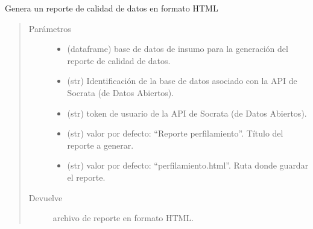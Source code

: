\documentclass[letterpaper,10pt,openany,spanish]{sphinxmanual}
\begin{document}
\label{\detokenize{reporte:module-reporte}}

\begin{fulllineitems}
\label{\detokenize{reporte:reporte.generar_reporte}}
Genera un reporte de calidad de datos en formato HTML
\begin{quote}\begin{description}
\item[{Parámetros}] \leavevmode\begin{itemize}
\item {} 
 \textendash{} (dataframe) base de datos de insumo para la generación del reporte de calidad de datos.

\item {} 
 \textendash{} (str) Identificación de la base de datos asociado con la API de Socrata (de Datos Abiertos).

\item {} 
 \textendash{} (str)  \sphinxhyphen{} token de usuario de la API de Socrata (de Datos Abiertos).

\item {} 
 \textendash{} (str) valor por defecto: “Reporte perfilamiento”. Título del reporte a generar.

\item {} 
 \textendash{} (str) valor por defecto: “perfilamiento.html”. Ruta donde guardar el reporte.

\end{itemize}

\item[{Devuelve}] \leavevmode
archivo de reporte en formato HTML.

\end{description}\end{quote}

\end{fulllineitems}
\end{document}

